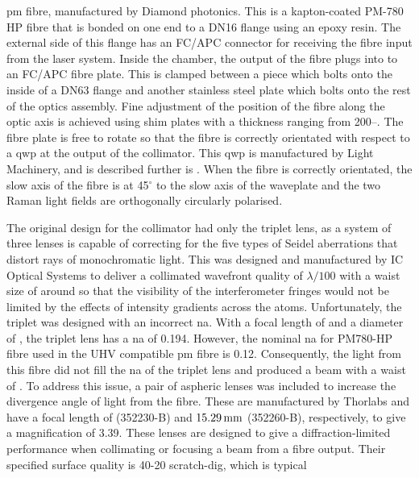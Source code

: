 \ac{pm} fibre, manufactured by Diamond photonics. This is a kapton-coated PM-780
HP fibre that is bonded on one end to a DN16 flange using an epoxy resin. The
external side of this flange has an FC/APC connector for receiving the
fibre input from the laser system. Inside the chamber, the output of the fibre plugs into to an FC/APC fibre
plate. This is clamped between a piece which bolts onto the inside of a DN63
flange and another stainless steel plate which bolts onto the rest of the optics
assembly. Fine adjustment of the position of the fibre along the optic axis is
achieved using shim plates with a thickness ranging from
200--. The fibre plate is free to rotate so
that the fibre is correctly orientated with respect to a \ac{qwp} at the output of the
collimator. This \ac{qwp} is manufactured by Light Machinery, and is described
further is . When the fibre is correctly
orientated, the slow axis of the fibre is at 45$^\circ$ to the slow
axis of the waveplate and the two Raman light fields are orthogonally circularly
polarised. 
\par\noindent 
The original design for the collimator had only the triplet lens, as a system of three lenses is capable of correcting for the
five types of Seidel aberrations that distort rays of monochromatic light. This
was designed and manufactured by IC Optical Systems to deliver a
collimated wavefront quality of $\lambda/100$ with a waist size
of around  so that the visibility of the
interferometer fringes would not be limited by the effects of intensity gradients across the
atoms. Unfortunately, the triplet was designed with an incorrect \ac{na}. With a
focal length of  and a diameter of
, the triplet lens has a \ac{na} of 0.194. However,
the nominal \ac{na} for PM780-HP fibre used in the UHV compatible \ac{pm} fibre
is 0.12. Consequently, the light from this fibre did not fill the \ac{na} of the
triplet lens and produced a beam with a waist of . 
To address this issue, a pair of aspheric lenses was included to increase
the divergence angle of light from the fibre. These are manufactured by Thorlabs
and have a focal length of  (352230-B) and
\(\sivalue{15.29}{\milli\metre}\) (352260-B), respectively, to give a
magnification of 3.39. These lenses are designed to give a diffraction-limited
performance when collimating or focusing a beam from a fibre output.
Their specified surface quality is 40-20 scratch-dig, which is typical
